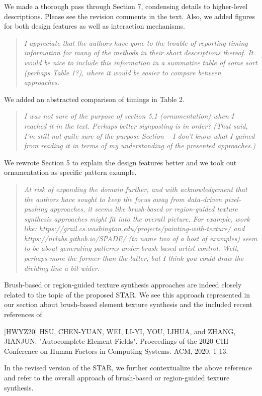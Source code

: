 \documentclass{egpubl}
\newcommand{\rev}[2]{{\color{greenrev}\textsuperscript{#1}#2}}
\renewcommand{\rev}[2]{{#2}}
\begin{document}
\rev{}{We made a thorough pass through Section 7, condensing details to higher-level descriptions. Please see the revision comments in the text. Also, we added figures for both design features as well as interaction mechanisms.}

\begin{quote}
\emph{I appreciate that the authors have gone to the trouble of reporting timing information for many of the methods in their short descriptions thereof. It would be nice to include this information in a summative table of some sort (perhaps Table 1?), where it would be easier to compare between approaches.}
\end{quote}


\rev{}{We added an abstracted comparison of timings in Table 2.}

\begin{quote}
\emph{I was not sure of the purpose of section 5.1 (ornamentation) when I reached it in the text. Perhaps better signposting is in order? (That said, I'm still not quite sure of the purpose Section -- I don't know what I gained from reading it in terms of my understanding of the presented approaches.)}
\end{quote}

\rev{}{We rewrote Section 5 to explain the design features better and we took out ornamentation as specific pattern example.}

\begin{quote}
\emph{At risk of expanding the domain further, and with acknowledgement that the authors have sought to keep the focus away from data-driven pixel-pushing approaches,  it seems like brush-based or region-guided texture synthesis approaches might fit into the overall picture. For example, work like:
https://grail.cs.washington.edu/projects/painting-with-texture/
and https://nvlabs.github.io/SPADE/
(to name two of a host of examples)
seem to be about generating patterns under brush-based artist control. Well, perhaps more the former than the latter, but I think you could draw the dividing line a bit wider.}
\end{quote}

\rev{}{
    Brush-based or region-guided texture synthesis approaches are indeed closely related to the topic of the proposed STAR. We see this approach represented in our section about brush-based element texture synthesis and the included recent references of 

    [HWYZ20]  HSU, CHEN-YUAN, WEI, LI-YI, YOU, LIHUA, and ZHANG, JIANJUN. "Autocomplete Element Fields". Proceedings of the 2020 CHI Conference on Human Factors in Computing Systems. ACM, 2020, 1-13.

    In the revised version of the STAR, we further contextualize the above reference and refer to the overall approach of brush-based or region-guided texture synthesis.
}
\end{document}
